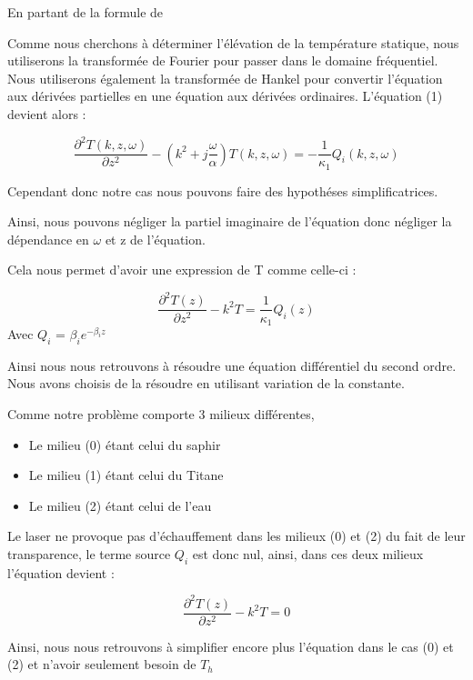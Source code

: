 \documentclass{rapportECC}
\begin{document}
En partant de la formule de 

Comme nous cherchons à déterminer l’élévation de la température statique,
nous utiliserons la transformée de Fourier pour passer dans le domaine
fréquentiel. Nous utiliserons également la transformée de Hankel pour convertir
l’équation aux dérivées partielles en une équation aux dérivées ordinaires.
L’équation (1) devient alors :

\begin{equation}
    \frac{\partial^2 T(k,z,\omega)}{\partial z^2} - (k^2 + j\frac{\omega}{\alpha}) T(k,z,\omega) = - \frac{1}{\kappa_1} Q_i(k,z,\omega)
\end{equation}

Cependant donc notre cas nous pouvons faire des hypothéses simplificatrices.

Ainsi, nous pouvons négliger la partiel imaginaire de l'équation donc négliger la dépendance en $\omega$ et z de l'équation.

Cela nous permet d'avoir une expression de T comme celle-ci :

\begin{equation}
    \frac{\partial^2 T(z)}{\partial z^2} - k^2 T = \frac{1}{\kappa_1}Q_i(z)
\end{equation}
Avec $Q_i$ = $\beta_i e^{-\beta_i z}$


Ainsi nous nous retrouvons à résoudre une équation différentiel du second ordre.\\
Nous avons choisis de la résoudre en utilisant variation de la constante.

Comme notre problème comporte 3 milieux différentes,
\begin{itemize}
    \item Le milieu (0) étant celui du saphir
    \item Le milieu (1) étant celui du Titane
    \item Le milieu (2) étant celui de l'eau
\end{itemize}

Le laser ne provoque pas d'échauffement dans les milieux (0) et (2) du fait de leur transparence, le terme source $Q_i$ est donc nul, ainsi, dans ces deux milieux l'équation devient :

\begin{equation}
    \frac{\partial^2 T(z)}{\partial z^2} - k^2 T = 0
\end{equation}

Ainsi, nous nous retrouvons à simplifier encore plus l'équation dans le cas (0) et (2) et n'avoir seulement besoin de $T_h$
\end{document}
